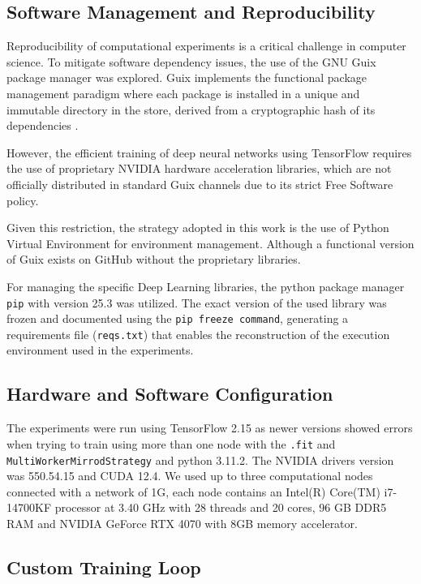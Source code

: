 \documentclass[format=acmsmall, review=false, screen=true]{acmart}
\begin{document}
\subsection{Software Management and Reproducibility}
\label{sec:org8928e76}

Reproducibility of computational experiments is a critical challenge
in computer science. To mitigate software dependency issues, the use
of the GNU Guix package manager was explored. Guix implements the
functional package management paradigm where each package is
installed in a unique and immutable directory in the store, derived
from a cryptographic hash of its dependencies \cite{courtes2013guix}.

However, the efficient training of deep neural networks using
TensorFlow requires the use of proprietary NVIDIA hardware
acceleration libraries, which are not officially distributed in
standard Guix channels due to its strict Free Software policy.

Given this restriction, the strategy adopted in this work is the use
of Python Virtual Environment for environment management. Although a
functional version of Guix exists on GitHub without the proprietary
libraries.

For managing the specific Deep Learning libraries, the python package
manager \texttt{pip} with version 25.3 was utilized. The exact version of the used library was
frozen and documented using the \texttt{pip freeze command}, generating a
requirements file (\texttt{reqs.txt}) that enables the reconstruction of the
execution environment used in the experiments.

\subsection{Hardware and Software Configuration}
\label{sec:org61ed65d}

The experiments were run using TensorFlow 2.15 as newer versions
showed errors when trying to train using more than one node with the
\texttt{.fit} and \texttt{MultiWorkerMirrodStrategy} and python 3.11.2. The NVIDIA
drivers version was 550.54.15 and CUDA 12.4. We used up to three
computational nodes connected with a network of 1G, each node contains an
Intel(R) Core(TM) i7-14700KF processor at 3.40 GHz with 28 threads and
20 cores, 96 GB DDR5 RAM and NVIDIA GeForce RTX 4070 with 8GB memory
accelerator.

\subsection{Custom Training Loop}
\label{sec:orgf7727b1}
\end{document}
